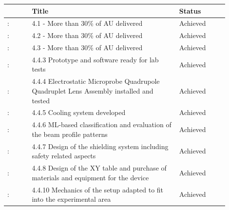 {\fontsize{9}{11}\selectfont
\begin{center}
  \begin{tabular}[t]{!{\color{mygray}\vrule}p{0.10\linewidth}!
  {\color{mygray}\vrule}p{0.60\linewidth}!
  {\color{mygray}\vrule}p{0.20\linewidth}!{\color{mygray}\vrule} } \hline
     & {\bf Title} & {\bf Status} \\ \hline
    : & 4.1 - More than 30\% of AU delivered &  Achieved \\ \hline
    : & 4.2 - More than 30\% of AU delivered &  Achieved \\ \hline
    : & 4.3 - More than 30\% of AU delivered &  Achieved \\ \hline
    : & 4.4.3 	Prototype and software ready for lab tests &  Achieved \\ \hline
    : & 4.4.4 	Electrostatic Microprobe Quadrupole Quadruplet Lens Assembly installed and tested &  Achieved \\ \hline
    : & 4.4.5 	Cooling system developed &  Achieved \\ \hline
    : & 4.4.6 ML-based classification and evaluation of the beam profile patterns &  Achieved \\ \hline
    : & 4.4.7 	Design of the shielding system including safety related aspects &  Achieved \\ \hline
    : & 4.4.8 	Design of the XY table and purchase of materials and equipment for the device &  Achieved \\ \hline
    : & 4.4.10 Mechanics of the setup adapted to fit into the experimental area &  Achieved \\ \hline

  \end{tabular}
\end{center}
}

